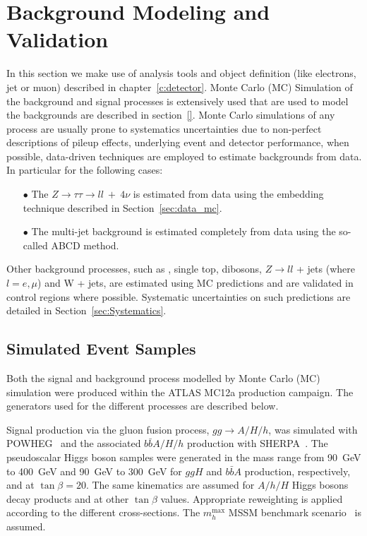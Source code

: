 \section{Background Modeling and Validation}
\label{sec:BackgroundEstimation}

In this section we make use of analysis tools and object definition
(like electrons, jet or muon) described in chapter~\ref{c:detector}.
Monte Carlo (MC) Simulation of the background and signal processes is extensively
used that are used to model the backgrounds are described in section~\ref{}.
Monte Carlo simulations of any process are usually prone to systematics
uncertainties due to non-perfect descriptions of pileup effects,
underlying event and detector performance, when possible, data-driven 
techniques are employed to estimate backgrounds from data. In particular for the following cases:
\begin{itemize}
  \item[$\bullet$] The $Z \rightarrow \tau\tau \rightarrow ll ~ + ~  4\nu$ is estimated from data using the embedding technique described in Section~\ref{sec:data_mc}.
  \item[$\bullet$] The multi-jet background is estimated completely from data using the so-called ABCD method.   
\end{itemize}
Other background processes, such as \ttbar, single top, dibosons, $Z
\rightarrow ll$ + jets (where $l = e,\mu$) and W + jets, are estimated
using MC predictions and are validated in control regions where possible. Systematic uncertainties on such predictions 
are detailed in Section~\ref{sec:Systematics}.

\subsection{Simulated Event Samples}
\label{sec:SimSamples}

Both the signal and background process modelled by Monte Carlo (MC)
simulation were produced within the ATLAS MC12a production campaign.
The generators used for the different processes are described below.

Signal production via the gluon fusion process, $gg\rightarrow A/H/h$,
was simulated with POWHEG~\cite{POWHEG} and the associated
$b\bar{b}A/H/h$ production with SHERPA~\cite{SHERPA}.  The
pseudoscalar Higgs boson samples were generated in the mass range from
90~GeV to 400~GeV and 90~GeV to 300~GeV for $ggH$ and $b\bar{b}A$
production, respectively, and at $\tan\beta = 20$. The same kinematics
are assumed for $A/h/H$ Higgs bosons decay products and at other
$\tan\beta$ values. Appropriate reweighting is applied according to the
different cross-sections. The $m_h^{\mathrm{max}}$ MSSM benchmark
scenario~\cite{MSSMmhmax} is assumed.

